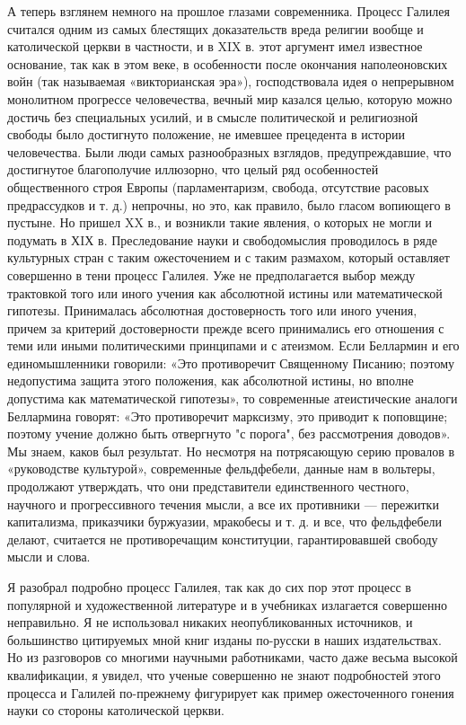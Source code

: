 А теперь взглянем немного на прошлое глазами современника. Процесс
Галилея считался одним из самых блестящих доказательств вреда религии
вообще и католической церкви в частности, и в XIX в. этот аргумент
имел известное основание, так как в этом веке, в особенности после
окончания наполеоновских войн (так называемая «викторианская эра»),
господствовала идея о непрерывном монолитном прогрессе человечества,
вечный мир казался целью, которую можно достичь без специальных
усилий, и в смысле политической и религиозной свободы было достигнуто
положение, не имевшее прецедента в истории человечества. Были
люди самых разнообразных взглядов, предупреждавшие, что достигнутое
благополучие иллюзорно, что целый ряд особенностей общественного строя
Европы (парламентаризм, свобода, отсутствие расовых предрассудков и т.
д.) непрочны, но это, как правило, было гласом вопиющего в пустыне. Но
пришел XX в., и возникли такие явления, о которых не могли и подумать
в ХIХ в.
Преследование науки и свободомыслия проводилось в ряде культурных стран с таким
ожесточением и с таким размахом, который оставляет совершенно в тени процесс
Галилея. Уже не предполагается выбор между трактовкой того или иного учения как
абсолютной истины или математической гипотезы. Принималась абсолютная
достоверность того или иного учения, причем за критерий достоверности прежде
всего принимались его отношения с теми или иными политическими принципами и с
атеизмом. Если Беллармин и его единомышленники говорили: «Это противоречит
Священному Писанию; поэтому недопустима защита этого положения, как абсолютной
истины, но вполне допустима как математической гипотезы», то современные
атеистические аналоги Беллармина говорят: «Это противоречит марксизму, это
приводит к поповщине; поэтому учение должно быть отвергнуто "с порога", без
рассмотрения доводов». Мы знаем, каков был результат. Но несмотря на
потрясающую серию провалов в «руководстве культурой», современные фельдфебели,
данные нам в вольтеры, продолжают утверждать, что они представители
единственного честного, научного и прогрессивного течения мысли, а все их
противники --- пережитки капитализма, приказчики буржуазии, мракобесы и т. д. и
все, что фельдфебели делают, считается не противоречащим конституции,
гарантировавшей свободу мысли и слова.

Я разобрал подробно процесс Галилея, так как до сих пор этот процесс в
популярной и художественной литературе и в учебниках излагается совершенно
неправильно. Я не использовал никаких неопубликованных источников, и
большинство цитируемых мной книг изданы по-русски в наших издательствах. Но из
разговоров со многими научными работниками, часто даже весьма высокой
квалификации, я увидел, что ученые совершенно не знают подробностей этого
процесса и Галилей по-прежнему фигурирует как пример ожесточенного гонения
науки со стороны католической церкви.

